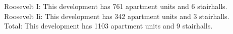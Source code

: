 {Roosevelt I}: This development has 761 apartment units and 6 stairhalls.\\{Roosevelt Ii}: This development has 342 apartment units and 3 stairhalls.\\{Total}: This development has 1103 apartment units and 9 stairhalls.\\